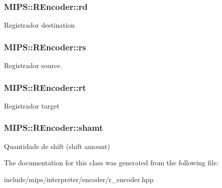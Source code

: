 \subsubsection[{\texorpdfstring{rd}{rd}}]{ M\+I\+P\+S\+::\+R\+Encoder\+::rd\hspace{0.3cm}{\ttfamily [protected]}}\hypertarget{classMIPS_1_1REncoder_a66d3a5016d3e8ed0dd36750961195e4a}{}\label{classMIPS_1_1REncoder_a66d3a5016d3e8ed0dd36750961195e4a}
Registrador destination 
\subsubsection[{\texorpdfstring{rs}{rs}}]{ M\+I\+P\+S\+::\+R\+Encoder\+::rs\hspace{0.3cm}{\ttfamily [protected]}}\hypertarget{classMIPS_1_1REncoder_a98545a1686a061f09c8ec3cae568df7e}{}\label{classMIPS_1_1REncoder_a98545a1686a061f09c8ec3cae568df7e}
Registrador source. 
\subsubsection[{\texorpdfstring{rt}{rt}}]{ M\+I\+P\+S\+::\+R\+Encoder\+::rt\hspace{0.3cm}{\ttfamily [protected]}}\hypertarget{classMIPS_1_1REncoder_a28985816a2e613fe596463094cbd24e6}{}\label{classMIPS_1_1REncoder_a28985816a2e613fe596463094cbd24e6}
Registrador target 
\subsubsection[{\texorpdfstring{shamt}{shamt}}]{ M\+I\+P\+S\+::\+R\+Encoder\+::shamt\hspace{0.3cm}{\ttfamily [protected]}}\hypertarget{classMIPS_1_1REncoder_a86e13a93659f403b2d251e66d70d7199}{}\label{classMIPS_1_1REncoder_a86e13a93659f403b2d251e66d70d7199}
Quantidade de shift (shift amount) 

The documentation for this class was generated from the following file\+:\begin{DoxyCompactItemize}
\item 
include/mips/interpreter/encoder/r\+\_\+encoder.\+hpp\end{DoxyCompactItemize}
